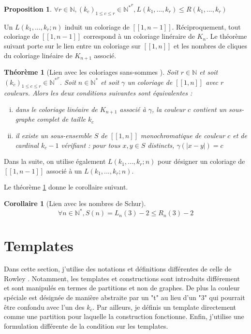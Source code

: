\documentclass{article}
\newtheorem{theorem}[definition]{Théorème}
\newtheorem{corollary}[definition]{Corollaire}
\newtheorem{proposition}[definition]{Proposition}
\begin{document}
\begin{proposition}
\(\forall r \in \mathbb{N}, (k_c)_{1 \leqslant c \leqslant r} \in {\mathbb{N}^*}^r, L(k_1, ..., k_r) \leqslant R(k_1, ..., k_r)\)
\end{proposition}

Un \(L(k_1, ..., k_r ; n)\) induit un coloriage de \([\![1, n - 1]\!]\). Réciproquement, tout coloriage de \([\![1, n - 1]\!]\) correspond à un coloriage linéraire de \(K_n\). Le théorème suivant porte sur le lien entre un coloriage sur \([\![1, n]\!]\) et les nombres de cliques du coloriage linéaire de \(K_{n+1}\) associé.

\begin{theorem}[Lien avec les coloriages sans-sommes \cite{AbbottHanson}]
\label{thm:lien-partitions}
Soit \(r \in \mathbb{N}\) et soit \((k_c)_{1 \leqslant c \leqslant r} \in {\mathbb{N}^*}^r\). Soit \(n \in \mathbb{N}^*\) et soit \(\gamma\) un coloriage de \([\![1, n]\!]\) avec \(r\) couleurs. Alors les deux conditions suivantes sont équivalentes :
\begin{enumerate}[(i)]
\item dans le coloriage linéaire de \(K_{n+1}\) associé à \(\gamma\), la couleur \(c\) contient un sous-graphe complet de taille \(k_c\)
\item il existe un sous-ensemble \(S\) de \([\![1, n]\!]\) monochromatique de couleur \(c\) et de cardinal \(k_c - 1\) vérifiant : pour tous \(x, y \in S\) distincts, \(\gamma(|x - y|) = c\) 
\end{enumerate}
\end{theorem}

Dans la suite, on utilise également \(L(k_1, ..., k_r ; n)\) pour désigner un coloriage de \([\![1, n - 1]\!]\)  associé à un \(L(k_1, ..., k_r ; n)\).

Le théorème \ref{thm:lien-partitions} donne le corollaire suivant.

\begin{corollary}[Lien avec les nombres de Schur]
\[\forall n \in \mathbb{N}^*, S(n) = L_n(3) - 2 \leqslant R_n(3) - 2\] 
\end{corollary}

\section{Templates}
\label{sec:temp}

Dans cette section, j'utilise des notations et définitions différentes de celle de Rowley \cite{RowleyRamsey}. Notamment, les templates et constructions sont introduits différement et sont manipulés en termes de partitions et non de graphes. De plus la couleur spéciale est désignée de manière abstraite par un "t" au lieu d'un "3" qui pourrait être confondu avec l'un des \(k_c\). Par ailleurs, je définis un template directement comme une partition pour laquelle la construction fonctionne. Enfin, j'utilise une formulation différente de la condition sur les templates.
\end{document}
